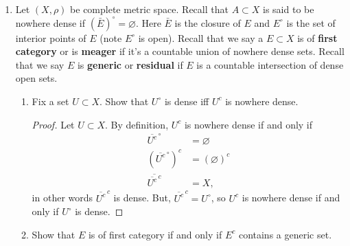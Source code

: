 \documentclass[11pt,oneside,english]{amsart}
\theoremstyle{definition}
\newcommand{\MB}[1]{\mathbb{#1}}
\begin{document}
\begin{enumerate}
\begin{proof}
Let $(X,\rho)$ be a complete metric space with metric $\rho$, and suppose that $X$ has no isolated point. Suppose $G\subset X$ is a generic set. Then we may write $G=\bigcap_{n=1}^\infty A_n$ where $A_n\subseteq X$ is an open dense set for each $n\in\MB{N}$. Consequently, $A_n^c$ is a nowhere dense set for every $n$. Suppose by way of contradiction that $G$ is countable. Then we may write 

\[
G=\bigcup_{x_i\in G}\{x_i\}=\bigcup_{i=1}^\infty\{x_i\},
\]
thus,
\[
X=G\cup G^c=\bigcup_{x_i\in G}\{x_i\}\cup\left(\bigcap_{n=1}^\infty A_n\right)^c=\bigcup_{i=1}^\infty\{x_i\}\cup\bigcup_{n=1}^\infty A_n^c.
\]

But $\{x_i\}$ is a nowhere dense set for all $i\in \MB{N}$. Thus, we have written $X$ as a countable union of nowhere dense sets, contradicting the Baire Category Theorem.
\end{proof}

\item Let $(X,\rho)$ be complete metric space. Recall that $A\subset X$ is said to be nowhere dense if $\left(\bar{E}\right)^\circ=\varnothing$. Here $\bar E$ is the closure of $E$ and $E^\circ$ is the set of interior points of $E$ (note $E^\circ$ is open). Recall that we say a $E\subset X$ is of \textbf{first category} or is \textbf{meager} if it's a countable union of nowhere dense sets. Recall that we say $E$ is \textbf{generic} or \textbf{residual} if $E$ is a countable intersection of dense open sets. 
\begin{enumerate}
\item Fix a set $U\subset X$. Show that $U^\circ$ is dense iff $U^c$ is nowhere dense.

\begin{proof}
Let $U\subset X$. By definition, $U^c$ is nowhere dense if and only if
\begin{align*}
\overline{U^c}^{\,\circ}&=\varnothing\\[2mm]
(\overline{U^c}^{\,\circ})^c&=(\varnothing)^c\\[2mm]
\overline{\overline{U^c}^{\,c}}&=X,
\end{align*}
in other words $\overline{U^c}^{\, c}$ is dense. But, $\overline{U^c}^{\, c}=U^\circ$, so $U^c$ is nowhere dense if and only if $U^\circ$ is dense.
\end{proof}

\pagebreak

\item Show that $E$ is of first category if and only if $E^c$ contains a generic set.


\end{enumerate}
\end{enumerate}
\end{document}
